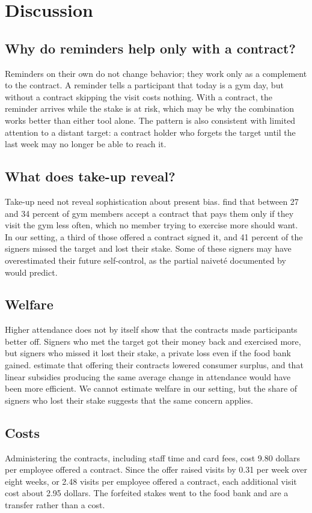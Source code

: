 \section{Discussion}
\label{sec:discussion}

\subsection{Why do reminders help only with a contract?}
Reminders on their own do not change behavior; they work only as a complement to the contract. A reminder tells a participant that today is a gym day, but without a contract skipping the visit costs nothing. With a contract, the reminder arrives while the stake is at risk, which may be why the combination works better than either tool alone. The pattern is also consistent with limited attention to a distant target: a contract holder who forgets the target until the last week may no longer be able to reach it.

\subsection{What does take-up reveal?}
Take-up need not reveal sophistication about present bias. \citet{carrera2018plans} find that between 27 and 34 percent of gym members accept a contract that pays them only if they visit the gym less often, which no member trying to exercise more should want. In our setting, a third of those offered a contract signed it, and 41 percent of the signers missed the target and lost their stake. Some of these signers may have overestimated their future self-control, as the partial naivet\'e documented by \citet{acland2015} would predict.

\subsection{Welfare}
Higher attendance does not by itself show that the contracts made participants better off. Signers who met the target got their money back and exercised more, but signers who missed it lost their stake, a private loss even if the food bank gained. \citet{carrera2022} estimate that offering their contracts lowered consumer surplus, and that linear subsidies producing the same average change in attendance would have been more efficient. We cannot estimate welfare in our setting, but the share of signers who lost their stake suggests that the same concern applies.

\subsection{Costs}
Administering the contracts, including staff time and card fees, cost 9.80 dollars per employee offered a contract. Since the offer raised visits by 0.31 per week over eight weeks, or 2.48 visits per employee offered a contract, each additional visit cost about 2.95 dollars. The forfeited stakes went to the food bank and are a transfer rather than a cost.

